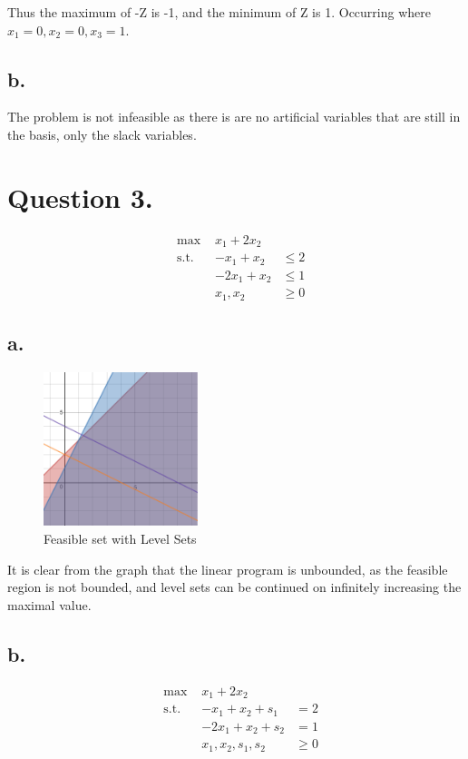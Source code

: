 \documentclass[10pt, letterpaper]{paper}
\begin{document}
Thus the maximum of -Z is -1, and the minimum of Z is 1. Occurring where $x_1 = 0, x_2 = 0, x_3 = 1$.

\subsection*{b.}
The problem is not infeasible as there is are no artificial variables that are still in the basis, only the slack variables.

\section*{Question 3.}
\begin{equation*}
\begin{alignedat}{3}
&\text{max }&x_1 + 2x_2&\\
&\text{s.t. } &-x_1 + x_2 &\leq 2\\
& &-2x_1 + x_2 &\leq 1\\
& &x_1, x_2 &\geq 0
\end{alignedat}
\end{equation*}
\subsection*{a.}
\begin{figure}[h!]
\centering
\includegraphics[width=0.4\textwidth]{desmos-graph__1_.png}
\caption{ Feasible set with Level Sets }
\end{figure}
It is clear from the graph that the linear program is unbounded, as the feasible region is not bounded, and level sets can be continued on infinitely increasing the maximal value.
\subsection*{b.}
\begin{equation*}
\begin{alignedat}{3}
&\text{max }&x_1 +2x_2&\\
&\text{s.t. } &-x_1 + x_2 + s_1 &= 2\\
& &-2x_1 + x_2 + s_2  &= 1\\
& &x_1, x_2, s_1, s_2 &\geq 0
\end{alignedat}
\end{equation*}
\end{document}
